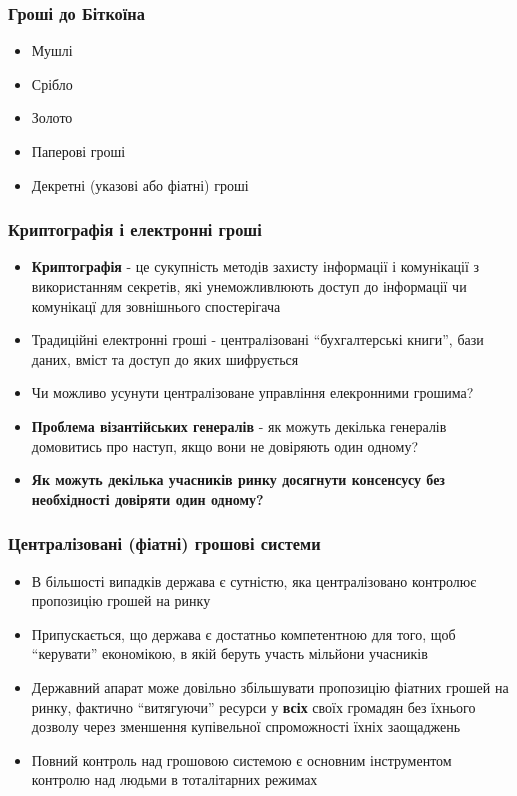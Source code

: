 \documentclass{beamer}
\begin{document}
\begin{frame}
  \frametitle{Гроші до Біткоїна}
  \begin{itemize}
  \item Мушлі
  \item Срібло
  \item Золото
  \item Паперові гроші
  \item Декретні (указові або фіатні) гроші
  \end{itemize}
\end{frame}

\begin{frame}
  \frametitle{Криптографія і електронні гроші}
  \begin{itemize}
  \item \textbf{Криптографія} - це сукупність методів захисту інформації і
    комунікації з використанням секретів, які унеможливлюють доступ до
    інформації чи комунікацї для зовнішнього спостерігача
  \item Традиційні електронні гроші - централізовані ``бухгалтерські книги'',
    бази даних, вміст та доступ до яких шифрується
  \item Чи можливо усунути централізоване управління елекронними грошима?
  \item \textbf{Проблема візантійських генералів} - як можуть декілька генералів
    домовитись про наступ, якщо вони не довіряють один одному?
  \item \textbf{Як можуть декілька учасників ринку досягнути консенсусу без
      необхідності довіряти один одному?}
  \end{itemize}
\end{frame}

\begin{frame}
  \frametitle{Централізовані (фіатні) грошові системи}
  \begin{itemize}
  \item В більшості випадків держава є сутністю, яка централізовано контролює
    пропозицію грошей на ринку
  \item Припускається, що держава є достатньо компетентною для того, щоб
    ``керувати'' економікою, в якій беруть участь мільйони учасників
  \item Державний апарат може довільно збільшувати пропозицію фіатних грошей на
    ринку, фактично ``витягуючи'' ресурси у \textbf{всіх} своїх громадян без
    їхнього дозволу через зменшення купівельної спроможності їхніх заощаджень
  \item Повний контроль над грошовою системою є основним інструментом контролю
    над людьми в тоталітарних режимах
  \end{itemize}
\end{frame}
\end{document}
